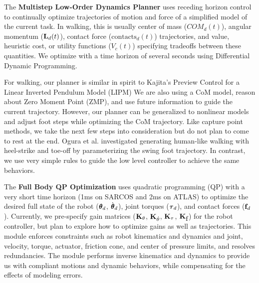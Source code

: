 \documentclass[letterpaper,12pt,fullpage]{article}
\begin{document}
The {\bf Multistep Low-Order Dynamics Planner} uses
receding horizon control to continually optimize trajectories of
motion and force of a simplified model of the current task.
In walking, this is usually center of mass ($COM_d(t)$),
angular momentum (${\bf L}_d(t)$),
contact force ($\mbox{contacts}_d(t)$) trajectories,
and value, heuristic cost, or utility functions ($V_c(t)$)
specifying tradeoffs between these quantities.
We optimize with a time horizon of several seconds
using Differential Dynamic Programming.

For walking, our planner is similar in spirit to Kajita's Preview Control for a Linear Inverted
Pendulum Model (LIPM)
We are also using a CoM
model, reason about Zero Moment Point (ZMP), and use future information 
to guide the current trajectory. However, our planner can be generalized to 
nonlinear models and adjust foot steps while optimizing the CoM 
trajectory. 
Like capture point methods,
we take the 
next few steps into consideration but
do not plan to come to rest at the end. Ogura et al.
investigated generating human-like walking with heel-strike and toe-off by 
parameterizing the swing foot trajectory. In contrast, we use very simple rules to guide the low level controller to achieve the same behaviors.

The {\bf Full Body QP Optimization} uses quadratic programming (QP) with a
very short time horizon (1ms on SARCOS and 2ms on ATLAS) to optimize the 
desired full state of the robot ($\vtheta_d$, $\dot{\vtheta}_d$),
joint torques ($\vtau_d$), and contact forces (${\bf f}_d$).
Currently, we pre-specify gain matrices 
(${\bf K}_{\theta}$, ${\bf K}_{\dot{\theta}}$, ${\bf K}_{\tau}$,
${\bf K}_{\mbox{f}}$)
for the robot controller, but plan to explore how to optimize gains
as well as trajectories.
This module enforces constraints
such as robot kinematics and dynamics 
and joint, velocity, torque, actuator, friction cone,
and center of pressure limits, and resolves redundancies.
The module performs inverse kinematics and dynamics to provide us with
compliant motions and dynamic behaviors, while compensating for the
effects of modeling errors.
\end{document}
